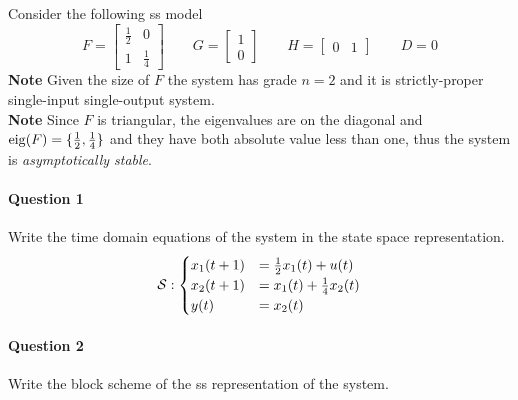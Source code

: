 
\begin{exa}
    Consider the following \gls{ss} model
    \[
    F = \begin{bmatrix}
        \frac{1}{2} & 0 \\
        1   & \frac{1}{4}
    \end{bmatrix}
    \qquad
    G = \begin{bmatrix}
        1 \\ 0
    \end{bmatrix}
    \qquad
    H = \begin{bmatrix}
        0 & 1
    \end{bmatrix}
    \qquad
    D = 0
    \]
    \textbf{Note} Given the size of $F$ the system has grade $n=2$ and it is strictly-proper single-input single-output system. \\
    \textbf{Note} Since $F$ is triangular, the eigenvalues are on the diagonal and $\operatorname*{eig} (F) = \{\frac{1}{2}, \frac{1}{4}\}$ and they have both absolute value less than one, thus the system is \emph{asymptotically stable}.

    \paragraph{Question 1} Write the time domain equations of the system in the state space representation.
    \[
        \mathcal{S}:
        \begin{cases}
            x_1(t+1) &= \frac{1}{2}x_1(t) + u(t) \\
            x_2(t+1) &= x_1(t) + \frac{1}{4}x_2(t) \\
            y(t) &= x_2(t)
        \end{cases}
    \]

    \paragraph{Question 2} Write the block scheme of the \gls{ss} representation of the system.
    \begin{figure}[H]
        \centering
\end{figure}
\end{exa}

